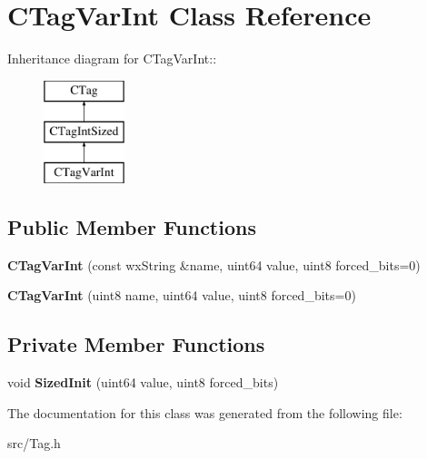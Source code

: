 \section{CTagVarInt Class Reference}
\label{classCTagVarInt}
Inheritance diagram for CTagVarInt::\begin{figure}[H]
\begin{center}
\leavevmode
\includegraphics[height=3cm]{classCTagVarInt}
\end{center}
\end{figure}
\subsection*{Public Member Functions}
\begin{DoxyCompactItemize}
\item 
{\bfseries CTagVarInt} (const wxString \&name, uint64 value, uint8 forced\_\-bits=0)\label{classCTagVarInt_a96088b18b2eaecacc241384da1a3f98e}

\item 
{\bfseries CTagVarInt} (uint8 name, uint64 value, uint8 forced\_\-bits=0)\label{classCTagVarInt_acb063639d6ad9db033245775924f9578}

\end{DoxyCompactItemize}
\subsection*{Private Member Functions}
\begin{DoxyCompactItemize}
\item 
void {\bfseries SizedInit} (uint64 value, uint8 forced\_\-bits)\label{classCTagVarInt_ab55cf4e83b2cd206bbf94a8cb2935c9f}

\end{DoxyCompactItemize}


The documentation for this class was generated from the following file:\begin{DoxyCompactItemize}
\item 
src/Tag.h\end{DoxyCompactItemize}
